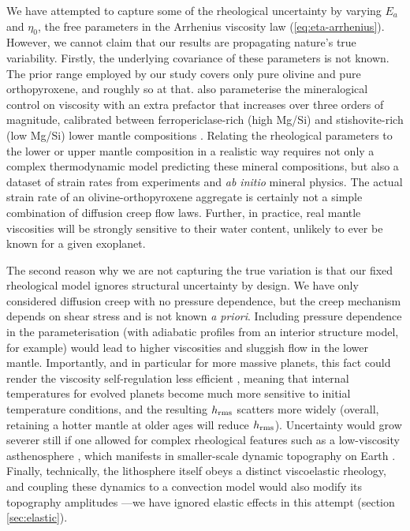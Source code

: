 We have attempted to capture some of the rheological uncertainty by varying $E_a$ and $\eta_0$, the free parameters in the Arrhenius viscosity law (\ref{eq:eta-arrhenius}). However, we cannot claim that our results are propagating nature's true variability. Firstly, the underlying covariance of these parameters is not known. The prior range employed by our study covers only pure olivine and pure orthopyroxene, and roughly so at that. \citet{spaargaren_influence_2020} also parameterise the mineralogical control on viscosity with an extra prefactor that increases over three orders of magnitude, calibrated between ferropericlase-rich (high Mg/Si) and stishovite-rich (low Mg/Si) lower mantle compositions \citep{xu_silicon_2017, ballmer_persistence_2017}. Relating the rheological parameters to the lower or upper mantle composition in a realistic way requires not only a complex thermodynamic model predicting these mineral compositions, but also a dataset of strain rates from experiments and \textit{ab initio} mineral physics. The actual strain rate of an olivine-orthopyroxene aggregate is certainly not a simple combination of diffusion creep flow laws. Further, in practice, real mantle viscosities will be strongly sensitive to their water content, unlikely to ever be known for a given exoplanet.

The second reason why we are not capturing the true variation is that our fixed rheological model ignores structural uncertainty by design. We have only considered diffusion creep with no pressure dependence, but the creep mechanism depends on shear stress and is not known \textit{a priori}. Including pressure dependence in the parameterisation (with adiabatic profiles from an interior structure model, for example) would lead to higher viscosities and sluggish flow in the lower mantle. Importantly, and in particular for more massive planets, this fact could render the viscosity self-regulation less efficient \citep{stamenkovic_influence_2012}, meaning that internal temperatures for evolved planets become much more sensitive to initial temperature conditions, and the resulting $h_{\rm rms}$ scatters more widely (overall, retaining a hotter mantle at older ages will reduce $h_{\rm rms}$). Uncertainty would grow severer still if one allowed for complex rheological features such as a low-viscosity asthenosphere \citep{bodur_impact_2019}, which manifests in smaller-scale dynamic topography on Earth \citep{hoggard_global_2016}. Finally, technically, the lithosphere itself obeys a distinct viscoelastic rheology, and coupling these dynamics to a convection model would also modify its topography amplitudes \citep{patocka_stress_2017}---we have ignored elastic effects in this attempt (section \ref{sec:elastic}).


